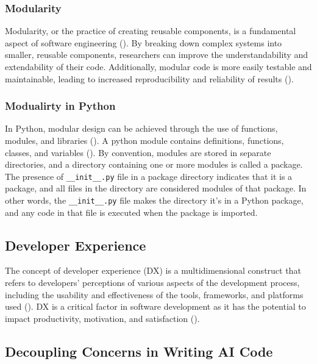 \subsubsection{Modularity}
Modularity, or the practice of creating reusable components, is a fundamental aspect of software engineering (\cite{pressman2010software}). By breaking down complex systems into smaller, reusable components, researchers can improve the understandability and extendability of their code. Additionally, modular code is more easily testable and maintainable, leading to increased reproducibility and reliability of results (\cite{amershi2019software,pressman2010software}). 
\subsubsection{Modualirty in Python}
In Python, modular design can be achieved through the use of functions, modules, and libraries (\cite{sanner1999python}). 
A python module contains definitions, functions, classes, and variables (\cite{raschka2015python}). By convention, modules are stored in separate directories, and a directory containing one or more modules is called a package. The presence of \verb|__init__.py| file in a package directory indicates that it is a package, and all files in the directory are considered modules of that package. In other words, the \verb|__init__.py| file makes the directory it's in a Python package, and any code in that file is executed when the package is imported.



\subsection{Developer Experience}
The concept of developer experience (DX) is a multidimensional construct that refers to developers' perceptions of various aspects of the development process, including the usability and effectiveness of the tools, frameworks, and platforms used (\cite{fagerholm2012developer}). DX is a critical factor in software development as it has the potential to impact productivity, motivation, and satisfaction (\cite{fagerholm2012developer}).



\subsection{Decoupling Concerns in Writing AI Code}


